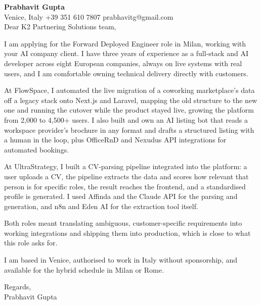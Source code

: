 \documentclass[a4paper,10.5pt]{article}
\begin{document}
\textbf{Prabhavit Gupta}\\
Venice, Italy \textbar{} +39 351 610 7807 \textbar{} prabhavitg@gmail.com\\[10pt]
Dear K2 Partnering Solutions team,

I am applying for the Forward Deployed Engineer role in Milan, working with your AI company client. I have three years of experience as a full-stack and AI developer across eight European companies, always on live systems with real users, and I am comfortable owning technical delivery directly with customers.

At FlowSpace, I automated the live migration of a coworking marketplace's data off a legacy stack onto Next.js and Laravel, mapping the old structure to the new one and running the cutover while the product stayed live, growing the platform from 2,000 to 4,500+ users. I also built and own an AI listing bot that reads a workspace provider's brochure in any format and drafts a structured listing with a human in the loop, plus OfficeRnD and Nexudus API integrations for automated bookings.

At UltraStrategy, I built a CV-parsing pipeline integrated into the platform: a user uploads a CV, the pipeline extracts the data and scores how relevant that person is for specific roles, the result reaches the frontend, and a standardised profile is generated. I used Affinda and the Claude API for the parsing and generation, and n8n and Eden AI for the extraction tool itself.

Both roles meant translating ambiguous, customer-specific requirements into working integrations and shipping them into production, which is close to what this role asks for.

I am based in Venice, authorised to work in Italy without sponsorship, and available for the hybrid schedule in Milan or Rome.

Regards,\\
Prabhavit Gupta
\end{document}
